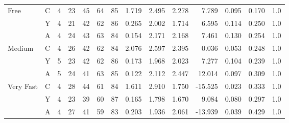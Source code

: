 \begin{table}
\begin{tabular}{llrrrrrrrrrrrr}
\cline{1-14}
\multirow{3}{*}{Free} & C &                      4 &         23 &         45 &         64 &         85 &                                 1.719 &      2.495 &      2.278 &      7.789 &               0.095 &      0.170 &        1.0 \\
          & Y &                      4 &         21 &         42 &         62 &         86 &                                 0.265 &      2.002 &      1.714 &      6.595 &               0.114 &      0.250 &        1.0 \\
          & A &                      4 &         24 &         43 &         63 &         84 &                                 0.154 &      2.171 &      2.168 &      7.461 &               0.130 &      0.254 &        1.0 \\
\cline{1-14}
\multirow{3}{*}{Medium} & C &                      4 &         26 &         42 &         62 &         84 &                                 2.076 &      2.597 &      2.395 &      0.036 &               0.053 &      0.248 &        1.0 \\
          & Y &                      5 &         23 &         42 &         62 &         86 &                                 0.173 &      1.968 &      2.023 &      7.277 &               0.104 &      0.239 &        1.0 \\
          & A &                      5 &         24 &         41 &         63 &         85 &                                 0.122 &      2.112 &      2.447 &     12.014 &               0.097 &      0.309 &        1.0 \\
\cline{1-14}
\multirow{3}{*}{Very Fast} & C &                      4 &         28 &         44 &         61 &         84 &                                 1.611 &      2.910 &      1.750 &    -15.525 &               0.023 &      0.333 &        1.0 \\
          & Y &                      4 &         23 &         39 &         60 &         87 &                                 0.165 &      1.798 &      1.670 &      9.084 &               0.080 &      0.297 &        1.0 \\
          & A &                      4 &         27 &         41 &         59 &         83 &                                 0.203 &      1.936 &      2.061 &    -13.939 &               0.039 &      0.429 &        1.0 \\
\bottomrule
\end{tabular}
\end{table}
